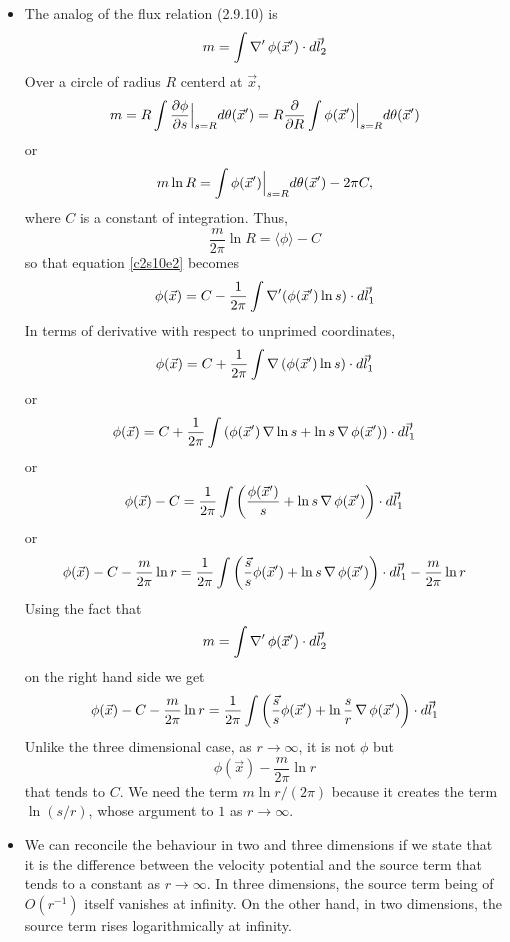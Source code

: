 \begin{itemize}
\item The analog of the flux relation (2.9.10) is
\[
m = \int\operatorname{\nabla}^\prime\phi(\vec{x}^\prime)\cdot d\vec{l}^\prime_2
\]
Over a circle of radius $R$ centerd at $\vec{x}$,
\[
m = R\int\frac{\partial{\phi}}{\partial{s}}\Big|_{s=R} d\theta(\vec{x}^\prime) = R\frac{\partial}{\partial R}\int\phi(\vec{x}^\prime)\Big|_{s=R}d\theta(\vec{x}^\prime)
\]
or
\[
m\ln R = \int\phi(\vec{x}^\prime)\Big|_{s=R}d\theta(\vec{x}^\prime) - 2\pi C,
\]
where $C$ is a constant of integration. Thus,
\[
\frac{m}{2\pi}\ln R = \langle\phi\rangle - C
\]
so that equation \eqref{c2s10e2} becomes
\[
\phi(\vec{x}) = C - \frac{1}{2\pi}\int\operatorname{\nabla}^\prime(\phi(\vec{x}^\prime)\ln s)\cdot d\vec{l}^\prime_1
\]
In terms of derivative with respect to unprimed coordinates,
\[
\phi(\vec{x}) = C + \frac{1}{2\pi}\int\operatorname{\nabla}{(\phi(\vec{x}^\prime)\ln s)}\cdot d\vec{l}^\prime_1
\]
or
\begin{equation}\label{c2s10e3}
\phi(\vec{x}) = C + \frac{1}{2\pi}\int\left(\phi(\vec{x}^\prime)\operatorname{\nabla}\ln s + \ln s\operatorname{\nabla}\phi(\vec{x}^\prime)\right)\cdot d\vec{l}^\prime_1
\end{equation}
or
\[
\phi(\vec{x}) - C = \frac{1}{2\pi}\int\left(\frac{\phi(\vec{x}^\prime)}{s} + \ln s\operatorname{\nabla}\phi(\vec{x}^\prime)\right)\cdot d\vec{l}^\prime_1
\]
or
\[
\phi(\vec{x}) - C - \frac{m}{2\pi}\ln r = \frac{1}{2\pi}\int\left(\frac{\vec{s}}{s}\phi(\vec{x}^\prime) + \ln s\operatorname{\nabla}\phi(\vec{x}^\prime)\right)\cdot d\vec{l}^\prime_1 - \frac{m}{2\pi}\ln r
\]
Using the fact that
\[
m = \int\operatorname{\nabla}^\prime\phi(\vec{x}^\prime)\cdot d\vec{l}^\prime_2
\]
on the right hand side we get
\[
\phi(\vec{x}) - C - \frac{m}{2\pi}\ln r = \frac{1}{2\pi}\int\left(\frac{\vec{s}}{s}\phi(\vec{x}^\prime) + \ln\frac{s}{r}\operatorname{\nabla}\phi(\vec{x}^\prime)\right)\cdot d\vec{l}^\prime_1
\]
Unlike the three dimensional case, as $r \rightarrow \infty$, it is not $\phi$ but 
\[
\phi(\vec{x}) - \frac{m}{2\pi}\ln r
\]
that tends to $C$. We need the term $m\ln r/(2\pi)$ because it creates the term $\ln(s/r)$, whose argument to $1$ as $r \rightarrow \infty$.

\item We can reconcile the behaviour in two and three dimensions if we state that it is the difference between the velocity potential and the source term that tends to a constant as 
$r \rightarrow \infty$. In three dimensions, the source term being of $O(r^{-1})$ itself vanishes at infinity. On the other hand, in two dimensions, the source term rises logarithmically
at infinity.


\end{itemize}
